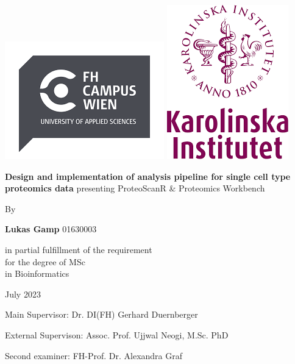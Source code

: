 \documentclass[
  11pt,
]{article}
\author{}
\date{\vspace{-2.5em}}
\begin{document}
\allsectionsfont{\centering}
\subsectionfont{\raggedright}
\subsubsectionfont{\raggedright}


\begin{centering}

\vspace{3cm}

\includegraphics[width=0.2\linewidth]{FHCW_logo} 
\includegraphics[width=0.2\linewidth]{KI_logo} 

\vspace{1cm}

\Large
\doublespacing
{\bf Design and implementation of analysis pipeline for single cell type proteomics data} 
presenting ProteoScanR & Proteomics Workbench

\vspace{1 cm}

\normalsize
\singlespacing
By

\vspace{0.5 cm}

\Large

{\bf Lukas Gamp}
01630003

\vspace{1.5 cm}

in partial fulfillment of the requirement \\for the degree of MSc \\in Bioinformatics

\vspace{1.5 cm}

\normalsize
July 2023

Main Supervisor: 
Dr. DI(FH) Gerhard Duernberger

External Supervison:
Assoc. Prof. Ujjwal Neogi, M.Sc. PhD

Second examiner:
FH-Prof. Dr. Alexandra Graf

\end{centering}
\end{document}

